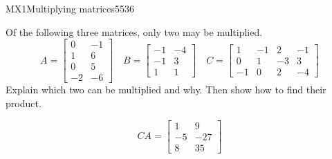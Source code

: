 \begin{exercise}{MX1}{Multiplying matrices}{5536} 
\begin{exerciseStatement} 

Of the following three matrices, only two may be multiplied. \[
          A=\left[\begin{array}{cc}
0 & -1 \\
1 & 6 \\
0 & 5 \\
-2 & -6
\end{array}\right] \hspace{1em} B=\left[\begin{array}{cc}
-1 & -4 \\
-1 & 3 \\
1 & 1
\end{array}\right] \hspace{1em} C=\left[\begin{array}{cccc}
1 & -1 & 2 & -1 \\
0 & 1 & -3 & 3 \\
-1 & 0 & 2 & -4
\end{array}\right]
      \] Explain which two can be multiplied and why. Then show how to find their product.

 \end{exerciseStatement}
 \begin{exerciseAnswer} \[CA=\left[\begin{array}{cc}
1 & 9 \\
-5 & -27 \\
8 & 35
\end{array}\right]\] \end{exerciseAnswer}
 \end{exercise}


